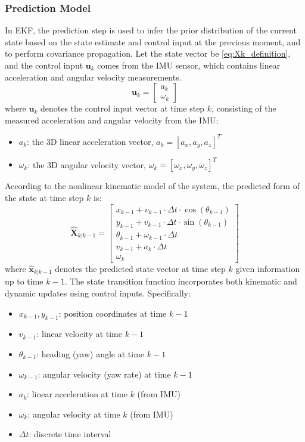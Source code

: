 \documentclass[12pt,a4paper]{article}
\numberwithin{equation}{section}
\begin{document}
\subsubsection{Prediction Model}
In EKF, the prediction step is used to infer the prior distribution of the current state based on the state estimate and control input at the previous moment, and to perform covariance propagation. Let the state vector be \autoref{eq:Xk_definition}, and the control input $\mathbf{u}_k$ comes from the IMU sensor, which contains linear acceleration and angular velocity measurements.
\begin{equation}
\mathbf{u}_k = 
\begin{bmatrix}
a_k \\
\omega_k
\end{bmatrix}
\label{eq:control_input}
\end{equation}
where $\mathbf{u}_k$ denotes the control input vector at time step $k$, consisting of the measured acceleration and angular velocity from the IMU:
\begin{itemize}
  \item $a_k$: the 3D linear acceleration vector, $a_k = [a_x, a_y, a_z]^T$
  \item $\omega_k$: the 3D angular velocity vector, $\omega_k = [\omega_x, \omega_y, \omega_z]^T$
\end{itemize}
According to the nonlinear kinematic model of the system, the predicted form of the state at time step $k$ is:
\begin{equation}
\hat{\mathbf{X}}_{k|k-1} =
\begin{bmatrix}
x_{k-1} + v_{k-1} \cdot \Delta t \cdot \cos(\theta_{k-1}) \\
y_{k-1} + v_{k-1} \cdot \Delta t \cdot \sin(\theta_{k-1}) \\
\theta_{k-1} + \omega_{k-1} \cdot \Delta t \\
v_{k-1} + a_k \cdot \Delta t \\
\omega_k
\end{bmatrix}
\label{eq:state_prediction}
\end{equation}
\noindent where $\hat{\mathbf{x}}_{k|k-1}$ denotes the predicted state vector at time step $k$ given information up to time $k{-}1$. The state transition function incorporates both kinematic and dynamic updates using control inputs. Specifically:
\begin{itemize}
    \item $x_{k-1}, y_{k-1}$: position coordinates at time $k{-}1$
    \item $v_{k-1}$: linear velocity at time $k{-}1$
    \item $\theta_{k-1}$: heading (yaw) angle at time $k{-}1$
    \item $\omega_{k-1}$: angular velocity (yaw rate) at time $k{-}1$
    \item $a_k$: linear acceleration at time $k$ (from IMU)
    \item $\omega_k$: angular velocity at time $k$ (from IMU)
    \item $\Delta t$: discrete time interval
\end{itemize}
\end{document}
